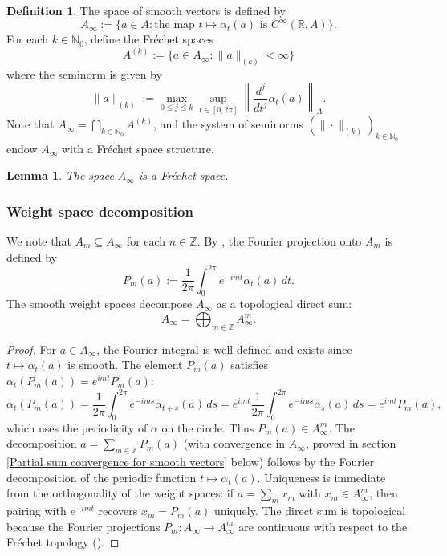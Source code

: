 \documentclass[11pt,reqno]{amsart}
\newtheorem{lemma}[theorem]{Lemma}
\theoremstyle{definition}
\newtheorem{definition}[theorem]{Definition}
\numberwithin{equation}{section}
\begin{document}
\begin{definition}
The space of smooth vectors is defined by
\[
A_{\infty} := \{a \in A : \text{the map } t \mapsto \alpha_t(a) \text{ is } C^{\infty}(\mathbb{R}, A)\}.
\]
For each $k \in \mathbb{N}_0$, define the Fréchet spaces
\[
A^{(k)} := \{a \in A_{\infty} : \|a\|_{(k)} < \infty\}
\]
where the seminorm is given by
\[
\|a\|_{(k)} := \max_{0 \le j \le k} \sup_{t \in [0, 2\pi]} \left\| \frac{d^j}{dt^j}\alpha_t(a) \right\|_A.
\]
Note that $A_{\infty} = \bigcap_{k \in \mathbb{N}_0} A^{(k)}$, and the system of seminorms $(\| \cdot \|_{(k)})_{k \in \mathbb{N}_0}$ endow $A_{\infty}$ with a Fréchet space structure.
\end{definition}

\begin{lemma}
The space $A_{\infty}$ is a Fréchet space.
\end{lemma}

\subsubsection{Weight space decomposition}
We note that $A_m \subseteq A_{\infty}$ for each $n \in \mathbb{Z}$. By  \cite[Proposition 3.3]{18}, the Fourier projection onto $A_m$ is defined by
\[
P_m(a) := \frac{1}{2\pi} \int_0^{2\pi} e^{-imt}\alpha_t(a) \, dt.
\]
The smooth weight spaces decompose $A_{\infty}$ as a topological direct sum:
\[
A_{\infty} = \bigoplus_{m \in \mathbb{Z}} A_{\infty}^m.
\]

\begin{proof}
For $a \in A_{\infty}$, the Fourier integral is well-defined and exists since $t \mapsto \alpha_t(a)$ is smooth. The element $P_m(a)$ satisfies $\alpha_t(P_m(a)) = e^{imt} P_m(a)$:
\[
\alpha_t(P_m(a)) = \frac{1}{2\pi} \int_0^{2\pi} e^{-ims}\alpha_{t+s}(a) \, ds = e^{imt} \frac{1}{2\pi} \int_0^{2\pi} e^{-ims}\alpha_s(a) \, ds = e^{imt} P_m(a),
\]
which uses the periodicity of $\alpha$ on the circle. Thus $P_m(a) \in A_{\infty}^m$. The decomposition $a = \sum_{m \in \mathbb{Z}} P_m(a)$ (with convergence in $A_{\infty}$, proved in section \ref{Partial sum convergence for smooth vectors} below) follows by the Fourier decomposition of the periodic function $t \mapsto \alpha_t(a)$. Uniqueness is immediate from the orthogonality of the weight spaces: if $a = \sum_m x_m$ with $x_m \in A_{\infty}^m$, then pairing with $e^{-imt}$ recovers $x_m = P_m(a)$ uniquely. The direct sum is topological because the Fourier projections $P_m : A_{\infty} \rightarrow A_{\infty}^m$ are continuous with respect to the Fréchet topology (\cite[ Proposition 3.3]{18}).
\end{proof}
\end{document}
